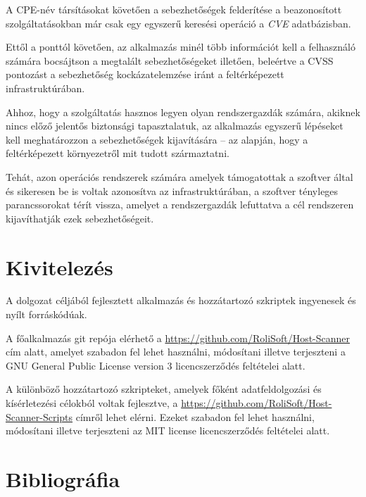\documentclass[a4paper,12pt]{article}
\begin{document}
	A CPE-név társításokat követően a sebezhetőségek felderítése a beazonosított szolgáltatásokban már csak egy egyszerű keresési operáció a \textit{CVE} adatbázisban.
	
	Ettől a ponttól követően, az alkalmazás minél több információt kell a felhasználó számára bocsájtson a megtalált sebezhetőségeket illetően, beleértve a CVSS pontozást a sebezhetőség kockázatelemzése iránt a feltérképezett infrastruktúrában.

	Ahhoz, hogy a szolgáltatás hasznos legyen olyan rendszergazdák számára, akiknek nincs előző jelentős biztonsági tapasztalatuk, az alkalmazás egyszerű lépéseket kell meghatározzon a sebezhetőségek kijavítására -- az alapján, hogy a feltérképezett környezetről mit tudott származtatni.

	Tehát, azon operációs rendszerek számára amelyek támogatottak a szoftver által és sikeresen be is voltak azonosítva az infrastruktúrában, a szoftver tényleges parancssorokat térít vissza, amelyet a rendszergazdák lefuttatva a cél rendszeren kijavíthatják ezek sebezhetőségeit.

\section{Kivitelezés}

	A dolgozat céljából fejlesztett alkalmazás és hozzátartozó szkriptek ingyenesek és nyílt forráskódúak.

	A főalkalmazás git repója elérhető a \url{https://github.com/RoliSoft/Host-Scanner} cím alatt, amelyet szabadon fel lehet használni, módosítani illetve terjeszteni a GNU General Public License version 3\cite{gplv3} licencszerződés feltételei alatt.
	
	A különböző hozzátartozó szkripteket, amelyek főként adatfeldolgozási és kísérletezési célokból voltak fejlesztve, a \url{https://github.com/RoliSoft/Host-Scanner-Scripts} címről lehet elérni. Ezeket szabadon fel lehet használni, módosítani illetve terjeszteni az MIT license\cite{mit} licencszerződés feltételei alatt.

\newpage
\section{Bibliográfia}

	\begingroup
	\renewcommand{\section}[2]{}
	\renewcommand{\markboth}[2]{}
		
		
	\endgroup
\end{document}
